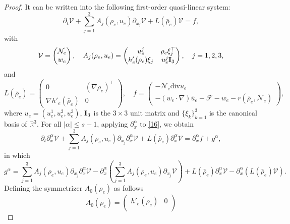 \documentclass[10pt,a4paper]{amsart}
\newcommand{\R}{\mathbb{R}}
\newcommand{\al}{\alpha}
\newcommand{\dive}{\mathrm{div}}
\newcommand{\pa}{\partial}
\newcommand{\pt}{\partial_t}
\begin{document}
\begin{proof}
It can be written into the following first-order quasi-linear system:
\begin{equation}\label{16}
    \pt \mathcal{V}+\sum_{j=1}^3 A_j(\rho_e,u_e) \partial_{x_j} \mathcal{V}+ L(\bar{\rho}_e)\mathcal{V}=f,
\end{equation}
with 
\begin{equation*}
    \mathcal{V}=\begin{pmatrix}
    \mathcal{N}_e \\
    w_e
    \end{pmatrix}, \ \ \
    A_j(\rho_e,u_e)=\begin{pmatrix}
    u_{e}^j & \rho_e \xi_j^\top\\
    h'_e(\rho_e)\xi_j& u_{e}^j {\bf{I}}_3
    \end{pmatrix},\ \ \ 
    j=1,2,3,
\end{equation*}
and
\begin{equation*}
    L(\bar{\rho}_e)=\begin{pmatrix}
    0 & (\nabla \bar{\rho}_e)^\top\\
    \nabla h'_e(\bar{\rho}_e) & 0
    \end{pmatrix}, \quad 
    f=\begin{pmatrix}
    - \mathcal{N}_e \dive\bar{u}_e\\
    -(w_e \cdot \nabla) \bar{u}_e
     -\mathcal{F}-w_e-r(\bar{\rho}_e,\mathcal{N}_e)
     \end{pmatrix},
\end{equation*}
where $u_e=(u_e^1, u_e^2, u_e^3)$, ${\bf{I}}_3$ is the $3\times 3$ unit matrix and $\{\xi_k\}_{k=1}^3$ is the canonical basis of $\R^3$. 
For all $|\alpha| \leq s-1$, applying $\pa_x^\al$ to \eqref{16}, we obtain
\begin{equation}\label{17}
    \pt \pa_x^\al \mathcal{V}+\sum_{j=1}^3 A_j(\rho_e,u_e) \partial_{x_j} \pa_x^\al \mathcal{V}+ L(\bar{\rho}_e)\pa_x^\al \mathcal{V}=\pa_x^\al f+g^\alpha,
\end{equation}
in which
\begin{equation*}
    g^\alpha=\sum_{j=1}^3 A_j(\rho_e,u_e) \partial_{x_j} \pa_x^\al \mathcal{V}-\pa_x^\al \left ( \sum_{j=1}^3 A_j(\rho_e,u_e) \partial_{x_j} \mathcal{V} \right )+L(\bar{\rho}_e)\pa_x^\al \mathcal{V}-\pa_x^\al \left (L(\bar{\rho}_e)\mathcal{V} \right ).
\end{equation*}
Defining the symmetrizer $A_0(\rho_e)$ as follows
\begin{equation*}
    A_0(\rho_e)=\begin{pmatrix}
    h'_e(\rho_e) & 0\\

\end{pmatrix}
\end{equation*}
\end{proof}
\end{document}
